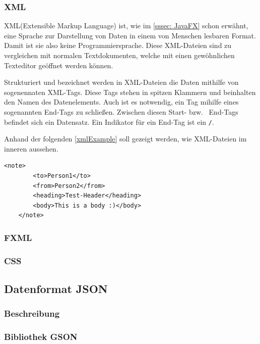 \subsubsection{XML}
XML(Extensible Markup Language) ist, wie im \autoref{sssec: JavaFX} schon erwähnt, eine Sprache zur Darstellung von Daten in einem von Menschen lesbaren Format.
Damit ist sie also keine Programmiersprache.
Diese XML-Dateien sind zu vergleichen mit normalen Textdokumenten, welche mit einen gewöhnlichen Texteditor geöffnet werden können.

Strukturiert und bezeichnet werden in XML-Dateien die Daten mithilfe von sogenennaten XML-Tags.
Diese Tags stehen in spitzen Klammern und beinhalten den Namen des Datenelements.
Auch ist es notwendig, ein Tag mihilfe eines sogenannten End-Tags zu schließen.
Zwischen diesen Start- bzw. \ End-Tags befindet sich ein Datensatz.
Ein Indikator für ein End-Tag ist ein \lstinline{/}.

Anhand der folgenden \autoref{xmlExample} soll gezeigt werden, wie XML-Dateien im inneren aussehen.
\begin{lstlisting}[style=xml,caption=XML-Codebeispiel,label=xmlExample]
    <note>
        <to>Person1</to>
        <from>Person2</from>
        <heading>Test-Header</heading>
        <body>This is a body :)</body>
    </note>
\end{lstlisting}

\subsubsection{FXML}

\subsubsection{CSS}

\subsection{Datenformat JSON}\label{subsec:json}

\subsubsection{Beschreibung}

\subsubsection{Bibliothek GSON}

